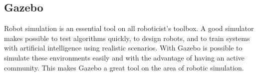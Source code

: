 
\subsection{Gazebo}

Robot simulation is an essential tool on all roboticist's toolbox.
A good simulator makes possible to test algorithms quickly, to design robots, and to train systems with artificial intelligence using realistic scenarios.
With Gazebo \cite{fairchild2016ros} is possible to simulate these environments easily and with the advantage of having an active community.
This makes Gazebo a great tool on the area of robotic simulation.
